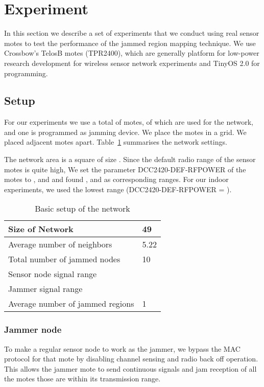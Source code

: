 \documentclass[conference]{IEEEtran}
\begin{document}
\section{Experiment}
\label{exp}

In this section we describe a set of experiments that we conduct using real sensor motes to test the performance of the jammed region mapping technique. We use Crossbow's TelosB motes (TPR2400), which are generally platform for low-power research development for wireless sensor network experiments and TinyOS 2.0 for programming.


\subsection{Setup}

For our experiments we use a total of  motes, of which  are used for the network, and one is programmed as jamming device.
We place the motes in a  grid. We placed adjacent motes  apart. Table~\ref{exp_env} summarises the network settings.

The network area is a square of size . Since the default radio range of the sensor motes is quite high, We set the parameter DCC2420-DEF-RFPOWER of the motes to ,  and  and found ,  and  as corresponding ranges. For our indoor experiments, we used the lowest range (DCC2420-DEF-RFPOWER = ). 


\begin{table}
\begin{center}
\caption{Basic setup of the network}
\begin{tabular}{ | l | p{1.5cm}|}
\hline
Size of Network & 49\\ \hline Average number of neighbors & 5.22\\ \hline
Total number of jammed nodes & 10\\ \hline
Sensor node signal range & \\ \hline
Jammer signal range & \\ \hline
Average number of jammed regions & 1\\ \hline
\end{tabular}
\label{exp_env}
\end{center}
\end{table}


\subsubsection{Jammer node}
To make a regular sensor node to work as the jammer, we bypass the MAC protocol for that mote by disabling channel sensing and radio back off operation. This allows the jammer mote to send continuous signals and jam reception of all the motes those are within its transmission range. 
\end{document}
